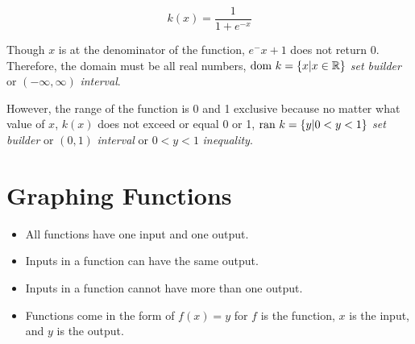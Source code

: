 {\color{blue}\[
    k(x)=\frac{1}{1+e^{-x}}
\]}

Though \(x\) is at the denominator of the function, \(e^-x+1\) does not return 0. Therefore, the domain must be all real numbers, \(\text{dom } k = \{x|x \in \mathbb{R}\}\) \emph{set builder} or \((-\infty,\infty)\)  \emph{interval}. 

However, the range of the function is 0 and 1 exclusive because no matter what value of \(x\), \(k(x)\) does not exceed or equal 0 or 1, \(\text{ran } k = \{y | 0 < y < 1\}\) \emph{set builder} or \((0,1)\) \emph{interval} or \(0 < y < 1\) \emph{inequality}.

\section{Graphing Functions}
\begin{tcolorbox}[colback=blue!10!white,colframe=blue!60!black,title=Main Ideas]
    \begin{itemize}
        \item All functions have one input and one output.
        \item Inputs in a function can have the same output.
        \item Inputs in a function cannot have more than one output.
        \item Functions come in the form of \(f(x)=y\) for \(f\) is the function, \(x\) is the input, and \(y\) is the output.
    \end{itemize}
\end{tcolorbox}
